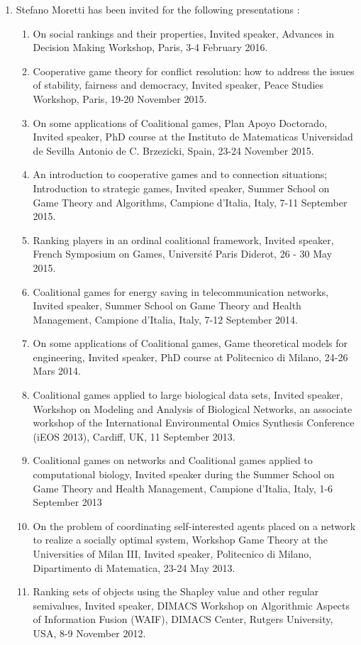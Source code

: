 \documentclass[version=last, pagesize, twoside=semi, DIV=calc, 12pt, a4paper, french, english, bibliography=totoc]{scrartcl}
\begin{document}
\begin{enumerate}
\item Stefano Moretti has been invited for the following presentations : 
\begin{enumerate}
\item  On social rankings and their properties, Invited speaker, Advances in Decision Making Workshop, Paris, 3-4 February 2016.
\item      Cooperative game theory for conflict resolution: how to address the issues of stability, fairness and
    democracy, Invited speaker, Peace Studies Workshop, Paris, 19-20 November 2015.
\item      On some applications of Coalitional games, Plan Apoyo Doctorado, Invited speaker, PhD course at the Instituto de
    Matematicas Universidad de Sevilla Antonio de C. Brzezicki, Spain, 23-24 November 2015.
\item      An introduction to cooperative games and to connection situations; Introduction to strategic games, Invited
    speaker, Summer School on Game Theory and Algorithms, Campione d’Italia, Italy, 7-11 September 2015.
\item      Ranking players in an ordinal coalitional framework, Invited speaker, French Symposium on Games,
    Universit\'e Paris Diderot, 26 - 30 May 2015.
\item      Coalitional games for energy saving in telecommunication networks, Invited speaker, Summer School on
    Game Theory and Health Management, Campione d’Italia, Italy, 7-12 September 2014.
\item      On some applications of Coalitional games, Game theoretical models for engineering, Invited speaker, PhD course at Politecnico di Milano, 24-26 Mars 2014.
\item      Coalitional games applied to large biological data sets, Invited speaker, Workshop on Modeling and
    Analysis of Biological Networks, an associate workshop of the International Environmental Omics Synthesis
    Conference (iEOS 2013), Cardiff, UK, 11 September 2013.
\item      Coalitional games on networks and Coalitional games applied to computational biology, Invited speaker
    during the Summer School on Game Theory and Health Management, Campione d’Italia, Italy, 1-6
    September 2013
\item      On the problem of coordinating self-interested agents placed on a network to realize a socially optimal
   system, Workshop Game Theory at the Universities of Milan III, Invited speaker, Politecnico di Milano, Dipartimento di
   Matematica, 23-24 May 2013.
\item      Ranking sets of objects using the Shapley value and other regular semivalues, Invited speaker, DIMACS Workshop
    on Algorithmic Aspects of Information Fusion (WAIF), DIMACS Center, Rutgers University, USA, 8-9 November 2012.
\end{enumerate}


\end{enumerate}
\end{document}
